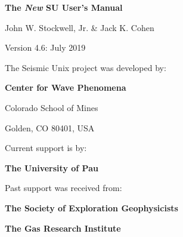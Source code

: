 %
%
%
\begin{titlepage}
\vspace*{1.3 in}
\centerline{\Huge \bf The {\em New\/} SU User's Manual}
\vspace{0.3in}
\centerline{\Large John W. Stockwell, Jr. \& Jack K. Cohen}
\vspace{0.5in}
\centerline{\Large Version 4.6: July 2019}

\vfill

\centerline{The Seismic Unix project was developed by:}
\vspace{3ex}
\centerline{\bf Center for Wave Phenomena}
\vspace{2ex}
\centerline{\epsfysize=0.675in }
\vspace{2ex}
\centerline{Colorado School of Mines}
\centerline{Golden, CO 80401, USA}
\vspace{2ex}
\centerline{Current support is by:}
\vspace{2ex}
\centerline{\bf The University of Pau}
\vspace{2ex}
\centerline{Past support was received from:}
\vspace{1ex}
\centerline{\bf The Society of Exploration Geophysicists}
\vspace{2ex}
\centerline{\epsfysize=0.775in }
\vspace{2ex}
\vspace{1ex}
\centerline{\bf The Gas Research Institute}
\vspace{2ex}
\centerline{\epsfysize=0.475in }

\end{titlepage}
%
